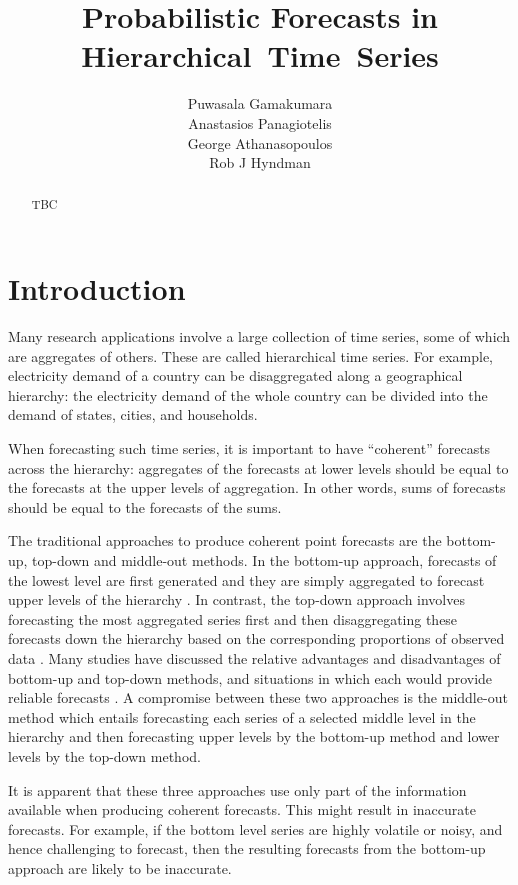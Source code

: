 \documentclass[a4paper, 11pt]{article}
\title{Probabilistic Forecasts in Hierarchical~Time~Series}
\author{Puwasala Gamakumara\\ Anastasios Panagiotelis\\ George Athanasopoulos\\ Rob J Hyndman}
\begin{document}
	
\maketitle

\begin{abstract}
	TBC
\end{abstract}


\section{Introduction}\label{sec:intro}

Many research applications involve a large collection of time series, some of which are aggregates of others. These are called hierarchical time series. For example, electricity demand of a country can be disaggregated along a geographical hierarchy: the electricity demand of the whole country can be divided into the demand of states, cities, and households. 

When forecasting such time series, it is important to have ``coherent'' forecasts across the hierarchy: aggregates of the forecasts at lower levels should be equal to the forecasts at the upper levels of aggregation. In other words, sums of forecasts should be equal to the forecasts of the sums.

The traditional approaches to produce coherent point forecasts are the bottom-up, top-down and middle-out methods. In the bottom-up approach, forecasts of the lowest level are first generated and they are simply aggregated to forecast upper levels of the hierarchy \citep{Dunn1976}. In contrast, the top-down approach involves forecasting the most aggregated series first and then disaggregating these forecasts down the hierarchy based on the corresponding proportions of observed data \citep{Gross1990}. Many studies have discussed the relative advantages and disadvantages of bottom-up and top-down methods, and situations in which each would provide reliable forecasts \citep{Schwarzkopf1988,Kahn1998, Lapide1998,Fliedner2001}. A compromise between these two approaches is the middle-out method which entails forecasting each series of a selected middle level in the hierarchy and then forecasting upper levels by the bottom-up method and lower levels by the top-down method. 

It is apparent that these three approaches use only part of the information available when producing coherent forecasts. This might result in inaccurate forecasts. For example, if the bottom level series are highly volatile or noisy, and hence challenging to forecast, then the resulting forecasts from the bottom-up approach are likely to be inaccurate.
\end{document}
